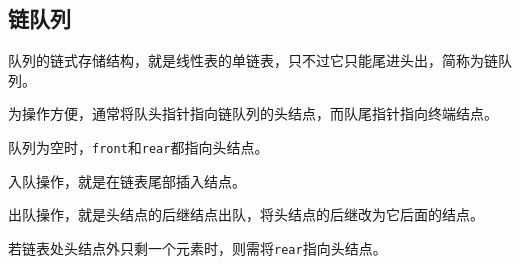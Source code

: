 \subsection{链队列}

\begin{frame}\ft{\subsecname}
\begin{dingyi}
队列的链式存储结构，就是线性表的单链表，只不过它只能尾进头出，简称为链队列。
\end{dingyi}
\end{frame}

\begin{frame}\ft{\subsecname}
\begin{zhu}
  为操作方便，通常将队头指针指向链队列的头结点，而队尾指针指向终端结点。
\end{zhu}
\pause


\end{frame}

\begin{frame}\ft{\subsecname}
\begin{zhu}
队列为空时，{\tt front}和{\tt rear}都指向头结点。  
\end{zhu}

\pause

\end{frame}




\begin{frame}

\end{frame}


\begin{frame}\ft{\subsecname}
入队操作，就是在链表尾部插入结点。\pause 

\end{frame}



\begin{frame}


\end{frame}

\begin{frame}\ft{\subsecname}
出队操作，就是头结点的后继结点出队，将头结点的后继改为它后面的结点。\pause 

\end{frame}

\begin{frame}\ft{\subsecname}
若链表处头结点外只剩一个元素时，则需将{\tt rear}指向头结点。

\end{frame}

